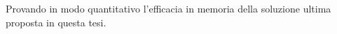 Provando in modo quantitativo l'efficacia in memoria della soluzione ultima
proposta in questa tesi.

    
